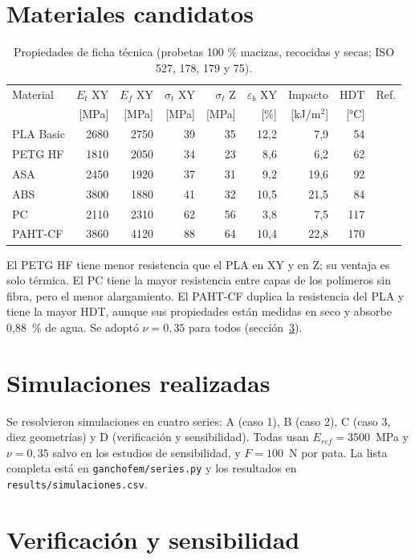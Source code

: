 \documentclass[11pt,a4paper]{article}
\begin{document}
\section{Materiales candidatos}
\begin{table}[htbp]\centering\small
\caption{Propiedades de ficha técnica (probetas 100 \% macizas, recocidas y secas; ISO 527, 178, 179 y 75).}
\begin{tabular}{lrrrrrrrr}\toprule
Material & $E_t$ XY & $E_f$ XY & $\sigma_t$ XY & $\sigma_t$ Z & $\varepsilon_b$ XY & Impacto & HDT & Ref.\\
& [MPa] & [MPa] & [MPa] & [MPa] & [\%] & [kJ/m$^2$] & [°C] & \\\midrule
PLA Basic & 2680 & 2750 & 39 & 35 & 12,2 & 7,9 & 54 & \cite{bl-pla}\\
PETG HF & 1810 & 2050 & 34 & 23 & 8,6 & 6,2 & 62 & \cite{bl-petg}\\
ASA & 2450 & 1920 & 37 & 31 & 9,2 & 19,6 & 92 & \cite{bl-asa}\\
ABS & 3800 & 1880 & 41 & 32 & 10,5 & 21,5 & 84 & \cite{bl-abs}\\
PC & 2110 & 2310 & 62 & 56 & 3,8 & 7,5 & 117 & \cite{bl-pc}\\
PAHT-CF & 3860 & 4120 & 88 & 64 & 10,4 & 22,8 & 170 & \cite{bl-paht}\\\bottomrule
\end{tabular}\end{table}
El PETG HF tiene menor resistencia que el PLA en XY y en Z; su ventaja es solo térmica. El PC tiene la mayor resistencia entre capas de los polímeros sin fibra, pero el menor alargamiento. El PAHT-CF duplica la resistencia del PLA y tiene la mayor HDT, aunque sus propiedades están medidas en seco y absorbe 0,88~\% de agua. Se adoptó $\nu=0{,}35$ para todos (sección~\ref{sec:verif}).

\section{Simulaciones realizadas}
Se resolvieron \NSims{} simulaciones en cuatro series: A (caso 1), B (caso 2), C (caso 3, diez geometrías) y D (verificación y sensibilidad). Todas usan $E_{ref}=3500$~MPa y $\nu=0{,}35$ salvo en los estudios de sensibilidad, y $F=100$~N por pata. La lista completa está en \texttt{ganchofem/series.py} y los resultados en \texttt{results/simulaciones.csv}.


\section{Verificación y sensibilidad}\label{sec:verif}




\end{document}
